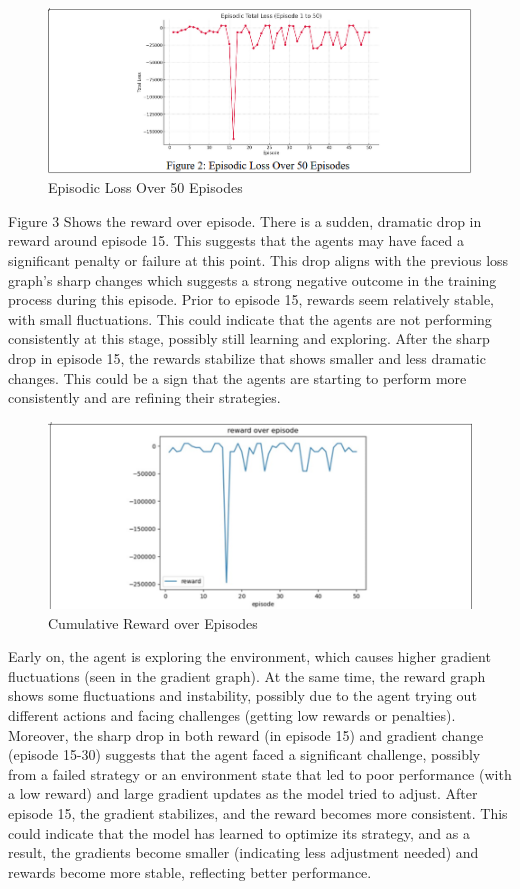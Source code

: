 \documentclass[a4paper,11pt]{article}
\begin{document}
\begin{figure}[H]
    \centering
    \includegraphics[width=0.75\linewidth]{fig2.png}
    \caption{Episodic Loss Over 50 Episodes}
    \label{fig:enter-label}
\end{figure}

Figure 3 Shows the reward over episode. There is a sudden, dramatic drop in reward around episode 15. This suggests that the agents may have faced a significant penalty or failure at this point. This drop aligns with the previous loss graph's sharp changes which suggests a strong negative outcome in the training process during this episode. Prior to episode 15, rewards seem relatively stable, with small fluctuations. This could indicate that the agents are not performing consistently at this stage, possibly still learning and exploring. After the sharp drop in episode 15, the rewards stabilize that shows smaller and less dramatic changes. This could be a sign that the agents are starting to perform more consistently and are refining their strategies. 

\begin{figure}
    \centering
    \includegraphics[width=0.75\linewidth]{fig3.png}
    \caption{Cumulative Reward over Episodes}
    \label{fig:enter-label}
\end{figure}

Early on, the agent is exploring the environment, which causes higher gradient fluctuations (seen in the gradient graph). At the same time, the reward graph shows some fluctuations and instability, possibly due to the agent trying out different actions and facing challenges (getting low rewards or penalties). Moreover, the sharp drop in both reward (in episode 15) and gradient change (episode 15-30) suggests that the agent faced a significant challenge, possibly from a failed strategy or an environment state that led to poor performance (with a low reward) and large gradient updates as the model tried to adjust. After episode 15, the gradient stabilizes, and the reward becomes more consistent. This could indicate that the model has learned to optimize its strategy, and as a result, the gradients become smaller (indicating less adjustment needed) and rewards become more stable, reflecting better performance.  
\end{document}

